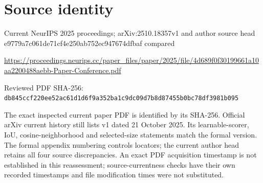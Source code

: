 \documentclass[11pt]{article}
\begin{document}
\section*{Source identity}

Current NeurIPS 2025 proceedings; arXiv:2510.18357v1 and author source head e9779a7c061de71cf4e250ab752ec947674dfbaf compared

\url{https://proceedings.neurips.cc/paper_files/paper/2025/file/4d689f0f30199661a10aa2200488aebb-Paper-Conference.pdf}

Reviewed PDF SHA-256: \nolinkurl{db845ccf220ee52ac61d1d6f9a352ba1c9dc09d7b8d87455b0bc78df3981b095}

The exact inspected current paper PDF is identified by its SHA-256. Official arXiv current history still lists v1 dated 21 October 2025. Its learnable-scorer, IoU, cosine-neighborhood and selected-size statements match the formal version. The formal appendix numbering controls locators; the current author head retains all four source discrepancies. An exact PDF acquisition timestamp is not established in this reassessment; source-currentness checks have their own recorded timestamps and file modification times were not substituted.
\end{document}
